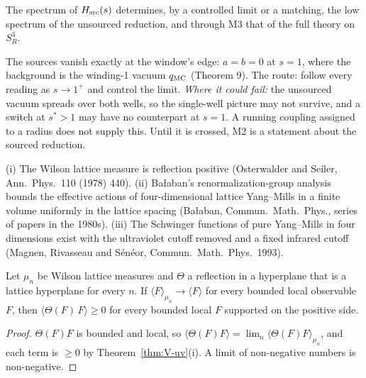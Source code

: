 \begin{conjecture}\label{conj:V-bridge}
The spectrum of $H_{\rm src}(s)$ determines, by a controlled limit or a matching, the low spectrum of the unsourced
reduction, and through M3 that of the full theory on $S^3_R$.
\end{conjecture}
\begin{sketch}
The sources vanish exactly at the window's edge: $a=b=0$ at $s=1$, where the background is the winding-1 vacuum
$q_{\rm MC}$ (Theorem 9). The route: follow every reading as $s\to1^+$ and control the limit. \emph{Where it could
fail:} the unsourced vacuum spreads over both wells, so the single-well picture may not survive, and a switch at
$s^*>1$ may have no counterpart at $s=1$. A running coupling assigned to a radius does not supply this. Until it is
crossed, M2 is a statement about the sourced reduction.
\end{sketch}

\medskip{}

\begin{theorem}\label{thm:V-uv}
(i) The Wilson lattice measure is reflection positive (Osterwalder and Seiler, Ann.\ Phys.\ 110 (1978) 440). (ii)
Ba{\l}aban's renormalization-group analysis bounds the effective actions of four-dimensional lattice Yang--Mills in a
finite volume uniformly in the lattice spacing (Ba{\l}aban, Commun.\ Math.\ Phys., series of papers in the 1980s).
(iii) The Schwinger functions of pure Yang--Mills in four dimensions exist with the ultraviolet cutoff removed and a
fixed infrared cutoff (Magnen, Rivasseau and S\'en\'eor, Commun.\ Math.\ Phys.\ 1993).
\end{theorem}

\begin{proposition}\label{prop:V-rp}
Let $\mu_n$ be Wilson lattice measures and $\Theta$ a reflection in a hyperplane that is a lattice hyperplane for
every $n$. If $\langle F\rangle_{\mu_n}\to\langle F\rangle$ for every bounded local observable $F$, then
$\langle\Theta(F)\,F\rangle\geq0$ for every bounded local $F$ supported on the positive side.
\end{proposition}
\begin{proof}
$\Theta(F)F$ is bounded and local, so $\langle\Theta(F)F\rangle=\lim_n\langle\Theta(F)F\rangle_{\mu_n}$, and each term is
$\geq0$ by Theorem~\ref{thm:V-uv}(i). A limit of non-negative numbers is non-negative.
\end{proof}

